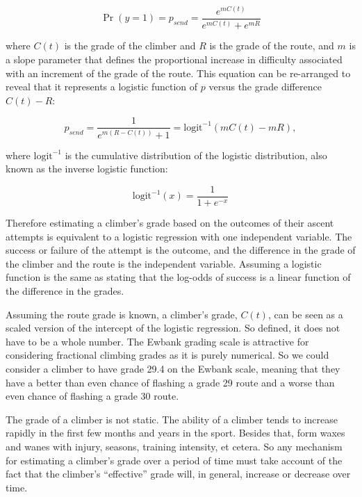 \documentclass[ba]{imsart}
\begin{document}
\begin{equation}
\Pr(y = 1) = p_{send} = \frac{e^{mC(t)}}{e^{mC(t)} + e^{mR}}
\end{equation}

where $C(t)$ is the grade of the climber and $R$ is the grade of the route, and $m$ is a slope parameter that defines the proportional increase in difficulty associated with an increment of the grade of the route. This equation can be re-arranged to reveal that it represents a logistic function of $p$ versus the grade difference $C(t)-R$:

\begin{equation}
p_{send} = \frac{1}{e^{m(R-C(t))} + 1} = \textrm{logit}^{-1}(mC(t)-mR),
\label{logisticp}
\end{equation}

where $\textrm{logit}^{-1}$ is the cumulative distribution of the logistic distribution, also known as the inverse logistic function:

\begin{equation}
\textrm{logit}^{-1}(x) = \frac{1}{1 + e^{-x}}
\end{equation}

Therefore estimating a climber's grade based on the outcomes of their ascent attempts is equivalent to a logistic regression with one independent variable. The success or failure of the attempt is the outcome, and the difference in the grade of the climber and the route is the independent variable. Assuming a logistic function is the same as stating that the log-odds of success is a linear function of the difference in the grades.

Assuming the route grade is known, a climber's grade, $C(t)$, can be seen as a scaled version of the intercept of the logistic regression. So defined, it does not have to be a whole number. The Ewbank grading scale is attractive for considering fractional climbing grades as it is purely numerical. So we could consider a climber to have grade 29.4 on the Ewbank scale, meaning that they have a better than even chance of flashing a grade 29 route and a worse than even chance of flashing a grade 30 route.

The grade of a climber is not static. The ability of a climber tends to increase rapidly in the first few months and years in the sport. Besides that, form waxes and wanes with injury, seasons, training intensity, et cetera. So any mechanism for estimating a climber's grade over a period of time must take account of the fact that the climber's ``effective'' grade will, in general, increase or decrease over time.
\end{document}
